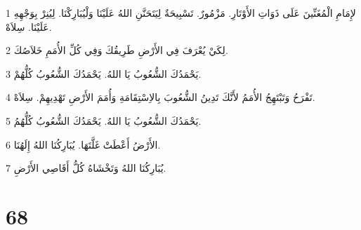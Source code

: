 \par 1 لإِمَامِ الْمُغَنِّينَ عَلَى ذَوَاتِ الأَوْتَارِ. مَزْمُورٌ. تَسْبِيحَةٌ لِيَتَحَنَّنِ اللهُ عَلَيْنَا وَلْيُبَارِكْنَا. لِيُنِرْ بِوَجْهِهِ عَلَيْنَا. سِلاَهْ.
\par 2 لِكَيْ يُعْرَفَ فِي الأَرْضِ طَرِيقُكَ وَفِي كُلِّ الأُمَمِ خَلاَصُكَ.
\par 3 يَحْمَدُكَ الشُّعُوبُ يَا اللهُ. يَحْمَدُكَ الشُّعُوبُ كُلُّهُمْ.
\par 4 تَفْرَحُ وَتَبْتَهِجُ الأُمَمُ لأَنَّكَ تَدِينُ الشُّعُوبَ بِالاِسْتِقَامَةِ وَأُمَمَ الأَرْضِ تَهْدِيهِمْ. سِلاَهْ.
\par 5 يَحْمَدُكَ الشُّعُوبُ يَا اللهُ. يَحْمَدُكَ الشُّعُوبُ كُلُّهُمُ.
\par 6 الأَرْضُ أَعْطَتْ غَلَّتَهَا. يُبَارِكُنَا اللهُ إِلَهُنَا.
\par 7 يُبَارِكُنَا اللهُ وَتَخْشَاهُ كُلُّ أَقَاصِي الأَرْضِ.

\chapter{68}

